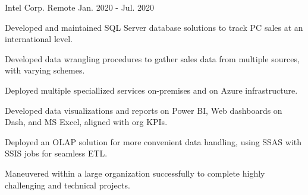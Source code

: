 \begin{cventries}
	{Intel Corp.} %
	{Remote} %
	{Jan. 2020 {-} Jul. 2020} %
	{
		\begin{cvitems}
			\item {Developed and maintained SQL Server database solutions to track PC sales at an international level.}
			\item {Developed data wrangling procedures to gather sales data from multiple sources, with varying schemes.}
			\item {Deployed multiple speciallized services on-premises and on Azure infrastructure.}
			\item {Developed data visualizations and reports on Power BI, Web dashboards on Dash, and MS Excel, aligned with org KPIs.}
			\item {Deployed an OLAP solution for more convenient data handling, using SSAS with SSIS jobs for seamless ETL.}
			\item {Maneuvered within a large organization successfully to complete highly challenging and technical projects.}
		\end{cvitems}
	}


\end{cventries}

